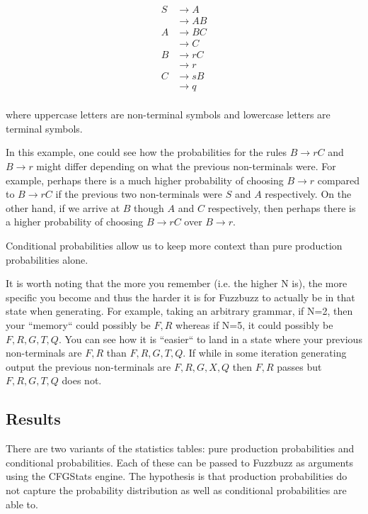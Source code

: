 \begin{align*}
S &\rightarrow A \\
&\rightarrow A B \\
A &\rightarrow B C \\
&\rightarrow C \\
B &\rightarrow r C \\
&\rightarrow r \\
C &\rightarrow s B \\
&\rightarrow q \\
\end{align*}

\noindent
where uppercase letters are non-terminal symbols and lowercase letters are
terminal symbols.


In this example, one could see how the probabilities for the rules $B
\rightarrow rC$ and $B \rightarrow r$ might differ depending on what the
previous non-terminals were. For example, perhaps there is a much higher
probability of choosing $B \rightarrow r$ compared to $B \rightarrow rC$ if the
previous two non-terminals were $S$ and $A$ respectively. On the other hand, if
we arrive at $B$ though $A$ and $C$ respectively, then perhaps there is a
higher probability of choosing $B \rightarrow rC$ over $B \rightarrow r$.

Conditional probabilities allow us to keep more context than pure production
probabilities alone.

It is worth noting that the more you remember (i.e. the higher N is), the more
specific you become and thus the harder it is for Fuzzbuzz to actually be in
that state when generating. For example, taking an arbitrary grammar, if N=2,
then your ``memory`` could possibly be $F, R$ whereas if N=5, it could possibly
be $F, R, G, T, Q$. You can see how it is ``easier`` to land in a state where
your previous non-terminals are $F, R$ than $F, R, G, T, Q$. If while in some
iteration generating output the previous non-terminals are $F, R, G, X, Q$ then
$F, R$ passes but $F, R, G, T, Q$ does not.

\subsection{Results}

There are two variants of the statistics tables: pure production probabilities
and conditional probabilities. Each of these can be passed to Fuzzbuzz as
arguments using the CFGStats engine. The hypothesis is that production
probabilities do not capture the probability distribution as well as
conditional probabilities are able to.

